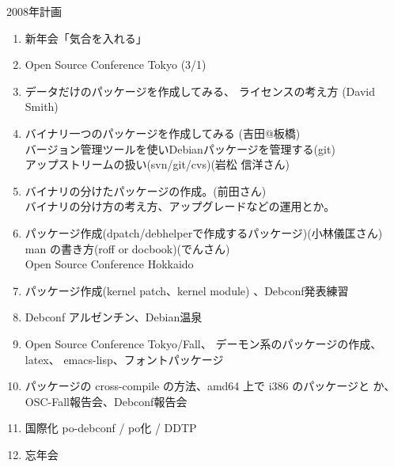 \documentclass[cjk,dvipdfmx,12pt]{beamer}
\begin{document}





\begin{frame}{2008年計画}

{\scriptsize
\begin{enumerate}
 \item 新年会「気合を入れる」
 \item Open Source Conference Tokyo (3/1)
 \item データだけのパッケージを作成してみる、
       ライセンスの考え方 (David Smith)
 \item バイナリ一つのパッケージを作成してみる (吉田@板橋)\\
       バージョン管理ツールを使いDebianパッケージを管理する(git)\\
       アップストリームの扱い(svn/git/cvs)(岩松 信洋さん)
 \item バイナリの分けたパッケージの作成。(前田さん)\\
       バイナリの分け方の考え方、アップグレードなどの運用とか。
 \item パッケージ作成(dpatch/debhelperで作成するパッケージ)(小林儀匡さん)\\
       man の書き方(roff or docbook)(でんさん)\\
       Open Source Conference Hokkaido
 \item パッケージ作成(kernel patch、kernel module)
       、Debconf発表練習
 \item Debconf アルゼンチン、Debian温泉

 \item Open Source Conference Tokyo/Fall、
       デーモン系のパッケージの作成、latex、 emacs-lisp、フォントパッケージ
 \item パッケージの cross-compile の方法、amd64 上で i386 のパッケージと
       か、OSC-Fall報告会、Debconf報告会
 \item 国際化 po-debconf / po化 / DDTP
 \item 忘年会
\end{enumerate}
}
\end{frame}
\end{document}
